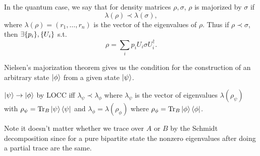 In the quantum case, we say that for density matrices $\rho,\sigma$, $\rho$ is majorized by $\sigma$ if
\begin{equation}
    \lambda(\rho) \prec \lambda (\sigma),
\end{equation}
where $\lambda(\rho)=(r_1,\ldots,r_n)$ is the vector of the eigenvalues of $\rho$. Thus if $\rho \prec \sigma$, then $\exists \{p_i\},\{U_i\}$ s.t. 
\begin{equation}
    \rho = \sum_i p_i U_i \sigma U_i^\dagger.
\end{equation}

Nielsen's majorization theorem gives us the condition for the construction of an arbitrary state $\lvert\phi\rangle$ from a given state $\lvert\psi\rangle$.
\begin{thm}
    $\lvert\psi\rangle\to \lvert\phi\rangle$ by LOCC iff $\lambda_\psi \prec \lambda_\phi$ where $\lambda_\psi$ is the vector of eigenvalues $\lambda(\rho_\psi)$ with $\rho_\psi=\operatorname{Tr}_B \left| \psi \right>\left< \psi \right|$ and $\lambda_\phi=\lambda(\rho_\phi)$ where $\rho_\phi=\operatorname{Tr}_B\left| \phi \right>\left< \phi \right|$.
\end{thm}
Note it doesn't matter whether we trace over $A$ or $B$ by the Schmidt decomposition since for a pure bipartite state the nonzero eigenvalues after doing a partial trace are the same.